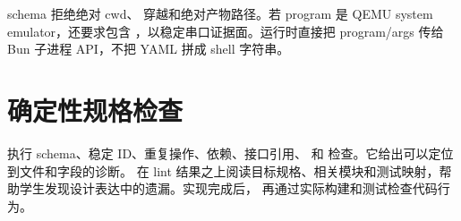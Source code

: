 schema 拒绝绝对 cwd、 穿越和绝对产物路径。若 program 是 QEMU system emulator，还要求包含 ，以稳定串口证据面。运行时直接把 program/args 传给 Bun 子进程 API，不把 YAML 拼成 shell 字符串。

\section{确定性规格检查}

 执行 schema、稳定 ID、重复操作、依赖、接口引用、 和  检查。它给出可以定位到文件和字段的诊断。 在 lint 结果之上阅读目标规格、相关模块和测试映射，帮助学生发现设计表达中的遗漏。实现完成后， 再通过实际构建和测试检查代码行为。

